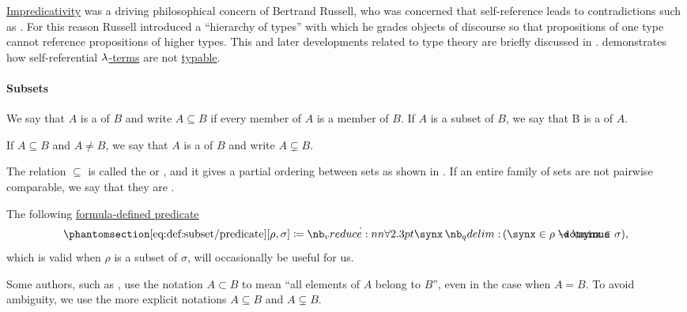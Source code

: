 \begin{remark}\label{rem:self_reference}
  \hyperref[con:impredicativity]{Impredicativity} was a driving philosophical concern of Bertrand Russell, who was concerned that self-reference leads to contradictions such as . For this reason Russell introduced a \enquote{hierarchy of types} with which he grades objects of discourse so that propositions of one type cannot reference propositions of higher types. This and later developments related to type theory are briefly discussed in .  demonstrates how self-referential \hyperref[def:lambda_term]{\( {\mathrm \lambda} \)-terms} are not \hyperref[def:typability]{typable}.
\end{remark}

\paragraph{Subsets}

\begin{definition}\label{def:subset}
  We say that \( A \) is a  of \( B \) and write \( A \subseteq B \) if every member of \( A \) is a member of \( B \). If \( A \) is a subset of \( B \), we say that B is a  of \( A \).

  If \( A \subseteq B \) and \( A \neq B \), we say that \( A \) is a  of \( B \) and write \( A \subsetneq B \).

  The relation \( \subseteq \) is called the  or , and it gives a partial ordering between sets as shown in . If an entire family of sets are not pairwise comparable, we say that they are .

  The following \hyperref[con:formula_defined_predicate]{formula-defined predicate}
  \begin{equation*}\taglabel[\op{IsSubset}]{eq:def:subset/predicate}
    \ref{eq:def:subset/predicate}[\rho, \sigma] \coloneqq \qforall \synx (\synx \in \rho \synimplies \synx \in \sigma),
  \end{equation*}
  which is valid when \( \rho \) is a subset of \( \sigma \), will occasionally be useful for us.
\end{definition}
\begin{comments}
  \item Some authors, such as \cite{Kelley1975GeneralTopology}, use the notation \( A \subset B \) to mean \enquote{all elements of \( A \) belong to \( B \)}, even in the case when \( A = B \). To avoid ambiguity, we use the more explicit notations \( A \subseteq B \) and \( A \subsetneq B \).
\end{comments}

